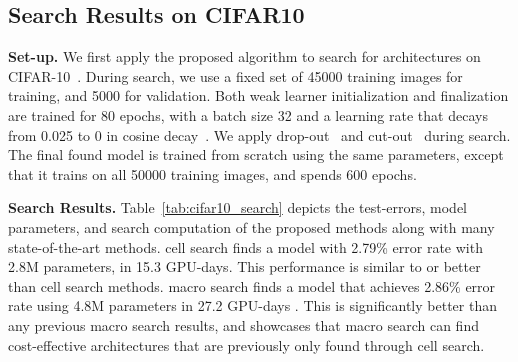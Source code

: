 



\subsection{Search Results on CIFAR10}
\label{sec:experiment_cifar10_search}

\textbf{Set-up.}
We first apply the proposed algorithm to search for architectures on CIFAR-10~\citep{cifar}. During search, we use a fixed set of 45000 training images for training, and 5000 for validation. Both weak learner initialization and finalization are trained for 80 epochs, with a batch size 32 and a learning rate that decays from 0.025 to 0 in cosine decay~\citep{cosine_lr}. We apply drop-out~\citep{larsson2016fractalnet} and cut-out~\citep{cutout} during search. The final found model is trained from scratch using the same parameters, except that it trains on all 50000 training images, and spends 600 epochs. 


\textbf{Search Results.} 
Table~\ref{tab:cifar10_search} depicts the test-errors, model parameters, and search computation of the proposed methods along with many state-of-the-art methods.
\Petridish cell search finds a model with 2.79\% error rate with 2.8M parameters, in 15.3 GPU-days. This performance is similar to or better than cell search methods. \Petridish macro search finds a model that achieves 2.86\% error rate using 4.8M parameters in 27.2 GPU-days . This is significantly better than any previous macro search results, 
and showcases that macro search can find cost-effective architectures that are previously only found through cell search. 

